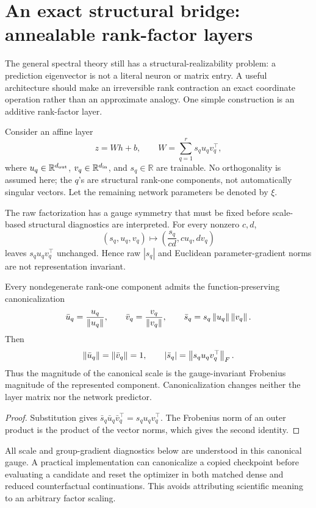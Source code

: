 \section{An exact structural bridge: annealable rank-factor layers}
The general spectral theory still has a structural-realizability problem: a prediction eigenvector is not a literal neuron or matrix entry. A useful architecture should make an irreversible rank contraction an exact coordinate operation rather than an approximate analogy. One simple construction is an additive rank-factor layer.

Consider an affine layer
\[
z=W h+b,
\qquad
W=\sum_{q=1}^{r}s_q u_qv_q^\top,
\]
where $u_q\in\mathbb R^{d_{\rm out}}$, $v_q\in\mathbb R^{d_{\rm in}}$, and $s_q\in\mathbb R$ are trainable. No orthogonality is assumed here; the $q$'s are structural rank-one components, not automatically singular vectors. Let the remaining network parameters be denoted by $\xi$.

The raw factorization has a gauge symmetry that must be fixed before scale-based structural diagnostics are interpreted. For every nonzero $c,d$,
\[
(s_q,u_q,v_q)
\mapsto
\left(\frac{s_q}{cd},cu_q,dv_q\right)
\]
leaves $s_qu_qv_q^\top$ unchanged. Hence raw $|s_q|$ and Euclidean parameter-gradient norms are not representation invariant.

\begin{proposition}\label{prop:rank-gauge}
Every nondegenerate rank-one component admits the function-preserving canonicalization
\[
\bar u_q=\frac{u_q}{\left\lVert u_q\right\rVert},
\qquad
\bar v_q=\frac{v_q}{\left\lVert v_q\right\rVert},
\qquad
\bar s_q=s_q\left\lVert u_q\right\rVert\left\lVert v_q\right\rVert.
\]
Then
\[
\left\lVert \bar u_q\right\rVert=\left\lVert \bar v_q\right\rVert=1,
\qquad
|\bar s_q|=\left\lVert s_qu_qv_q^\top\right\rVert_{F}.
\]
Thus the magnitude of the canonical scale is the gauge-invariant Frobenius magnitude of the represented component. Canonicalization changes neither the layer matrix nor the network predictor.
\end{proposition}

\begin{proof}
Substitution gives $\bar s_q\bar u_q\bar v_q^\top=s_qu_qv_q^\top$. The Frobenius norm of an outer product is the product of the vector norms, which gives the second identity.
\end{proof}

All scale and group-gradient diagnostics below are understood in this canonical gauge. A practical implementation can canonicalize a copied checkpoint before evaluating a candidate and reset the optimizer in both matched dense and reduced counterfactual continuations. This avoids attributing scientific meaning to an arbitrary factor scaling.

